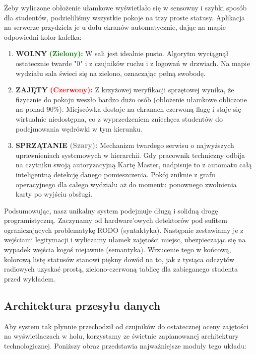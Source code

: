 \documentclass[12pt,a4paper]{article}
\begin{document}
Żeby wyliczone obłożenie ułamkowe wyświetlało się w sensowny i szybki sposób dla studentów, podzieliliśmy wszystkie pokoje na trzy proste statusy. Aplikacja na serwerze przydziela je u dołu ekranów automatycznie, dając na mapie odpowiedni kolor kafelka:

\begin{enumerate}
    \item \textbf{WOLNY} \textcolor{green}{\textbf{(Zielony):}} W sali jest idealnie pusto. Algorytm wyciągnął ostatecznie twarde "0" i z czujników ruchu i z logowań w drzwiach. Na mapie wydziału sala świeci się na zielono, oznaczając pełną swobodę.
    \item \textbf{ZAJĘTY} \textcolor{red}{\textbf{(Czerwony):}} Z krzyżowej weryfikacji sprzętowej wynika, że fizycznie do pokoju weszło bardzo dużo osób (obłożenie ułamkowe obliczone na ponad 90\%). Miejscówka dostaje na ekranach czerwoną flagę i staje się wirtualnie niedostępna, co z wyprzedzeniem zniechęca studentów do podejmowania wędrówki w tym kierunku.
    \item \textbf{SPRZĄTANIE} \textcolor{gray}{\textbf{(Szary):}} Mechanizm twardego serwisu o najwyższych uprawnieniach systemowych w hierarchii. Gdy pracownik techniczny odbija na czytniku swoją autoryzacyjną Kartę Master, nadpisuje to z automatu całą inteligentną detekcję danego pomieszczenia. Pokój zniknie z grafu operacyjnego dla całego wydziału aż do momentu ponownego zwolnienia karty po wyjściu obsługi.
\end{enumerate}

Podsumowując, nasz unikalny system podejmuje długą i solidną drogę programistyczną. Zaczynamy od hardware'owych detektorów pod sufitem ograniczających problematykę RODO (syntaktyka). Następnie zestawiamy je z wejściami legitymacji i wyliczamy ułamek zajętości miejsc, ubezpieczając się na wypadek wejścia kogoś niejawnie (semantyka). Wrzucenie tego w końcową, kolorową listę statusów stanowi piękny dowód na to, jak z tysiąca odczytów radiowych uzyskać prostą, zielono-czerwoną tablicę dla zabieganego studenta przed wykładem.

\subsection{Architektura przesyłu danych}

Aby system tak płynnie przechodził od czujników do ostatecznej oceny zajętości na wyświetlaczach w holu, korzystamy ze świetnie zaplanowanej architektury technologicznej. Poniższy obraz przedstawia najważniejsze moduły tego układu:
\end{document}
